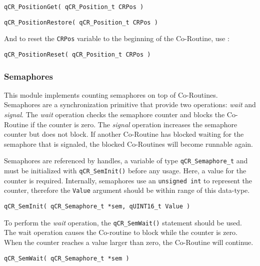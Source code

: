 \begin{lstlisting}[style=CStyle]
qCR_PositionGet( qCR_Position_t CRPos )
\end{lstlisting}

\begin{lstlisting}[style=CStyle]
qCR_PositionRestore( qCR_Position_t CRPos )
\end{lstlisting}

And to reset the \lstinline{CRPos} variable to the beginning of the Co-Routine, use :

\begin{lstlisting}[style=CStyle]
qCR_PositionReset( qCR_Position_t CRPos )
\end{lstlisting}

\subsubsection{Semaphores}
This module implements counting semaphores on top of Co-Routines. Semaphores are a synchronization primitive that provide two operations: \textit{wait} and \textit{signal}. The \textit{wait} operation checks the semaphore counter and blocks the Co-Routine if the counter is zero. The \textit{signal} operation increases the semaphore counter but does not block. If another Co-Routine has blocked waiting for the semaphore that is signaled, the blocked Co-Routines will become runnable again.

Semaphores are referenced by handles, a variable of type \lstinline{qCR_Semaphore_t} and must be initialized with \lstinline{qCR_SemInit()}  before any usage.  Here, a value for the counter is required. Internally, semaphores use an \lstinline{unsigned int} to represent the counter, therefore the \lstinline{Value} argument should be within range of this data-type.
\medskip

\begin{lstlisting}[style=CStyle]
qCR_SemInit( qCR_Semaphore_t *sem, qUINT16_t Value )
\end{lstlisting}

To perform the \textit{wait} operation, the \lstinline{qCR_SemWait()}  statement should be used. The wait operation causes the Co-routine to block while the counter is zero. When the counter reaches a value larger than zero, the Co-Routine will continue.
\medskip


\begin{lstlisting}[style=CStyle]
qCR_SemWait( qCR_Semaphore_t *sem )
\end{lstlisting}

